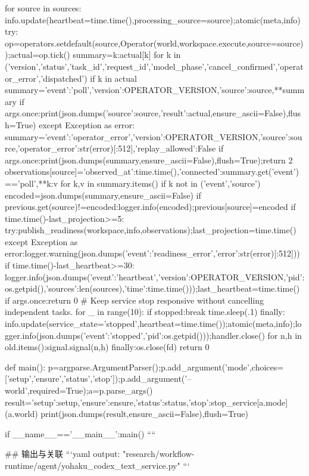                 for source in sources:
                    info.update(heartbeat=time.time(),processing_source=source);atomic(meta,info)
                    try:
                        op=operators.setdefault(source,Operator(world,workspace.execute,source=source));actual=op.tick()
                        summary={k:actual[k] for k in ('version','status','task_id','request_id','model_phase','cancel_confirmed','operator_error','dispatched') if k in actual}
                        summary={'event':'poll','version':OPERATOR_VERSION,'source':source,**summary}
                        if args.once:print(json.dumps({'source':source,'result':actual},ensure_ascii=False),flush=True)
                    except Exception as error:
                        summary={'event':'operator_error','version':OPERATOR_VERSION,'source':source,'operator_error':str(error)[:512],'replay_allowed':False}
                        if args.once:print(json.dumps(summary,ensure_ascii=False),flush=True);return 2
                    observations[source]={'observed_at':time.time(),'connected':summary.get('event')=='poll',**{k:v for k,v in summary.items() if k not in ('event','source')}}
                    encoded=json.dumps(summary,ensure_ascii=False)
                    if previous.get(source)!=encoded:logger.info(encoded);previous[source]=encoded
                if time.time()-last_projection>=5:
                    try:publish_readiness(workspace,info,observations);last_projection=time.time()
                    except Exception as error:logger.warning(json.dumps({'event':'readiness_error','error':str(error)[:512]}))
                if time.time()-last_heartbeat>=30:
                    logger.info(json.dumps({'event':'heartbeat','version':OPERATOR_VERSION,'pid':os.getpid(),'sources':len(sources),'time':time.time()}));last_heartbeat=time.time()
                if args.once:return 0
                # Keep service stop responsive without cancelling independent tasks.
                for _ in range(10):
                    if stopped:break
                    time.sleep(.1)
        finally:
            info.update(service_state='stopped',heartbeat=time.time());atomic(meta,info);logger.info(json.dumps({'event':'stopped','pid':os.getpid()}));handler.close()
            for n,h in old.items():signal.signal(n,h)
    finally:os.close(fd)
    return 0

def main():
    p=argparse.ArgumentParser();p.add_argument('mode',choices=['setup','ensure','status','stop']);p.add_argument('--world',required=True);a=p.parse_args()
    result={'setup':setup,'ensure':ensure,'status':status,'stop':stop_service}[a.mode](a.world)
    print(json.dumps(result,ensure_ascii=False),flush=True)

if __name__=='__main__':main()
````

## 输出与关联
```yaml
output: "research/workflow-runtime/agent/yohaku_codex_text_service.py"
```
